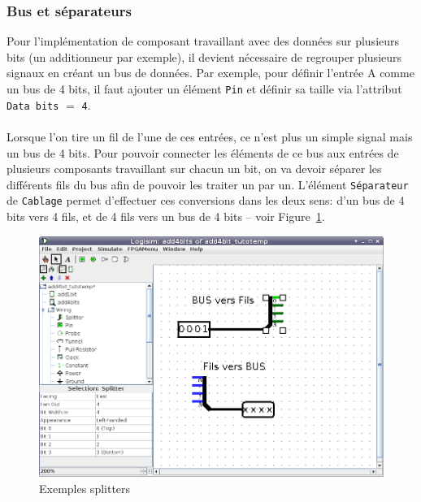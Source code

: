 \documentclass{article}
\begin{document}
    \subsubsection{Bus et séparateurs}

    Pour l'implémentation de composant travaillant avec des données sur plusieurs bits (un additionneur par exemple),
    il devient nécessaire de regrouper plusieurs signaux en créant un bus de données.
    Par exemple, pour définir l'entrée A comme un bus de 4 bits, il
    faut ajouter un élément \texttt{Pin} et définir sa taille via l'attribut \texttt{Data bits} $=$ \texttt{4}.

    \paragraph{}
    Lorsque l'on tire un fil de l'une de ces entrées, ce n'est plus un simple signal mais un bus de 4 bits.
    Pour
    pouvoir connecter les éléments de ce bus aux entrées de plusieurs composants travaillant sur chacun un bit,
    on va devoir séparer les différents fils du bus afin de pouvoir les traiter un par un.
    L'élément \texttt{Séparateur}
    de \texttt{Cablage} permet d'effectuer ces conversions dans les deux sens: d'un bus de 4 bits vers 4 fils,
    et de 4 fils vers un bus de 4 bits -- voir Figure~\ref{fig_splitter}.

    \begin{figure}[H]
        \begin{center}
            \includegraphics[width=500pt]{pictures/logisim_splitters.png}
            \caption{\label{fig_splitter}Exemples splitters}
        \end{center}
    \end{figure}
\end{document}
